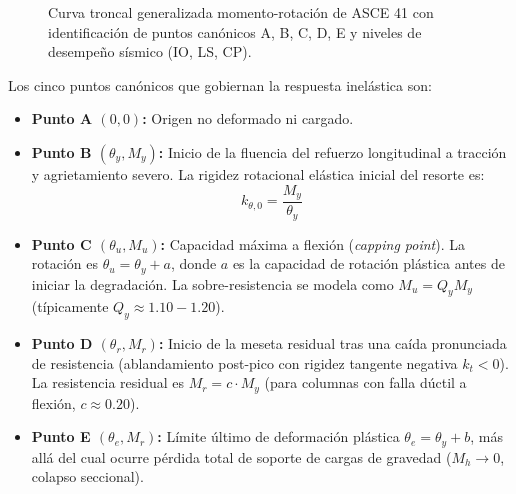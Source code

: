 \documentclass[11pt,letterpaper]{article}
\begin{document}
\begin{figure}[htbp]
\caption{Curva troncal generalizada momento-rotación de ASCE 41 con identificación de puntos canónicos A, B, C, D, E y niveles de desempeño sísmico (IO, LS, CP).}
\label{fig:curva_asce41}
\end{figure}

Los cinco puntos canónicos que gobiernan la respuesta inelástica son:
\begin{itemize}
    \item \textbf{Punto A $(0, 0)$:} Origen no deformado ni cargado.
    \item \textbf{Punto B $(\theta_y, M_y)$:} Inicio de la fluencia del refuerzo longitudinal a tracción y agrietamiento severo. La rigidez rotacional elástica inicial del resorte es:
    \begin{equation}
    k_{\theta,0} = \frac{M_y}{\theta_y}
    \end{equation}
    \item \textbf{Punto C $(\theta_u, M_u)$:} Capacidad máxima a flexión (\textit{capping point}). La rotación es $\theta_u = \theta_y + a$, donde $a$ es la capacidad de rotación plástica antes de iniciar la degradación. La sobre-resistencia se modela como $M_u = Q_y M_y$ (típicamente $Q_y \approx 1.10 - 1.20$).
    \item \textbf{Punto D $(\theta_r, M_r)$:} Inicio de la meseta residual tras una caída pronunciada de resistencia (ablandamiento post-pico con rigidez tangente negativa $k_t < 0$). La resistencia residual es $M_r = c \cdot M_y$ (para columnas con falla dúctil a flexión, $c \approx 0.20$).
    \item \textbf{Punto E $(\theta_e, M_r)$:} Límite último de deformación plástica $\theta_e = \theta_y + b$, más allá del cual ocurre pérdida total de soporte de cargas de gravedad ($M_h \to 0$, colapso seccional).
\end{itemize}
\end{document}
